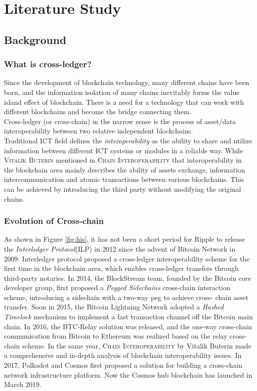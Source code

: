 \chapter{Literature Study} 
\label{chap:2}
\section{Background}

\subsection{What is cross-ledger?}
\noindent Since the development of blockchain technology, many different chains have been born, and the information isolation of many chains inevitably forms the value island effect of blockchain. There is a need for a technology that can work with different blockchains and become the bridge connecting them. \\
\noindent Cross-ledger (or cross-chain) in the narrow sense is the process of asset/data interoperability between two relative independent blockchains.\\
\noindent Traditional ICT field defines the \textit{interoperability} as the ability to share and utilize information between different ICT systems or modules in a reliable way\cite{osello2015bim}. While \textsc{Vitalik Buterin} mentioned in \textsc{Chain Interoperability}\cite{buterin2016chain} that interoperability in the blockchain area mainly describes the ability of assets exchange, information intercommunication and atomic transactions between various blockchains. This can be achieved by introducing the third party without modifying the original chains.
\subsection{Evolution of Cross-chain}
\noindent As shown in Figure \ref{fig:his}, it has not been a short period for Ripple to release the \textit{Interledger Protocol}(ILP)\cite{thomas2015protocol} in 2012 since the advent of Bitcoin Network in 2009. Interledger protocol proposed a cross-ledger interoperability scheme for the first time in the blockchain area, which enables cross-ledger transfers through third-party notaries. In 2014, the BlockStream team, founded by the Bitcoin core developer group, first proposed a \textit{Pegged Sidechains} cross-chain interaction scheme, introducing a sidechain with a two-way peg to achieve cross- chain asset transfer. Soon in 2015, the Bitcoin Lightning Network\cite{poon2016bitcoin} adopted a \textit{Hashed Timelock} mechanism to implement a fast transaction channel off the Bitcoin main chain. In 2016, the BTC-Relay\cite{btc-relay} solution was released, and the one-way cross-chain communication from Bitcoin to Ethereum was realized based on the relay cross-chain scheme. In the same year, \textsc{Chain Interoperability}\cite{buterin2016chain} by Vitalik Buterin made a comprehensive and in-depth analysis of blockchain interoperability issues. In 2017, Polkadot and Cosmos first proposed a solution for building a cross-chain network infrastructure platform. Now the Cosmos hub blockchain has launched in March 2019.

